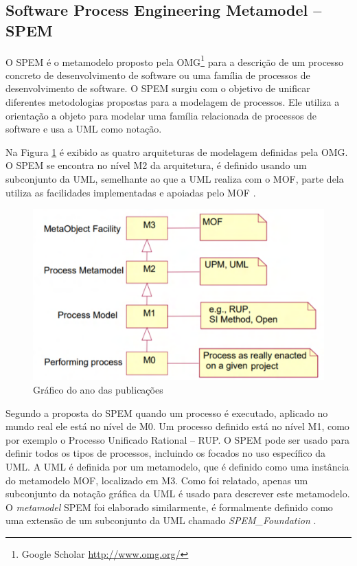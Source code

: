 \subsection{Software Process Engineering Metamodel -- SPEM}


O SPEM é o metamodelo proposto pela OMG\footnote{Google Scholar \url{http://www.omg.org/}} para a descrição de um processo concreto de desenvolvimento de software ou uma família de processos de desenvolvimento de software. O SPEM surgiu com o objetivo de unificar diferentes metodologias propostas para a modelagem de processos. Ele utiliza a orientação a objeto para modelar uma família relacionada de processos de software e usa a UML como notação.

Na Figura \ref{fig:niveisSpem} é exibido as quatro arquiteturas de modelagem definidas pela OMG. O SPEM se encontra no nível M2 da arquitetura, é definido usando um subconjunto da UML, semelhante ao que a UML realiza com o MOF, parte dela utiliza as facilidades implementadas e apoiadas pelo MOF \cite{genvigir2003modelagem}.  

\begin{figure}[!htb]
	\caption{Gráfico do ano das publicações}\label{fig:niveisSpem}
	\begin{center}
		\includegraphics[scale=0.350]{img/spemNiveis}
	\end{center}
\end{figure}

Segundo a proposta do SPEM quando um processo é executado, aplicado no mundo real ele está no nível de M0. Um processo definido está no nível M1, como por exemplo o Processo Unificado Rational -- RUP. O SPEM pode ser usado para definir todos os tipos de processos, incluindo os focados no uso específico da UML. A UML é definida por um metamodelo, que é definido como uma instância do metamodelo MOF, localizado em M3. Como foi relatado, apenas um subconjunto da notação gráfica da UML é usado para descrever este metamodelo. O \textit{metamodel} SPEM foi elaborado similarmente, é formalmente definido como uma extensão de um subconjunto da UML chamado \textit{SPEM\_Foundation} \cite{genvigir2003modelagem}. 

